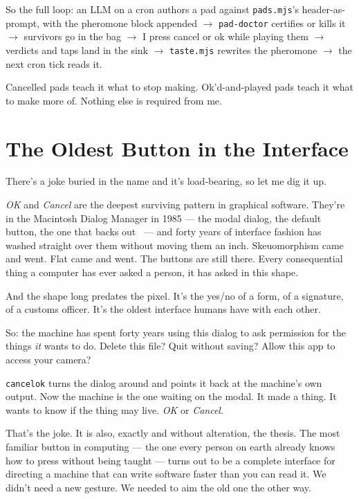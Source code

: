 \documentclass[10pt,letterpaper,twocolumn]{article}
\begin{document}
So the full loop: an LLM on a cron authors a pad against \texttt{pads.mjs}'s header-as-prompt, with the pheromone block appended $\rightarrow$ \texttt{pad-doctor} certifies or kills it $\rightarrow$ survivors go in the bag $\rightarrow$ I press cancel or ok while playing them $\rightarrow$ verdicts and taps land in the sink $\rightarrow$ \texttt{taste.mjs} rewrites the pheromone $\rightarrow$ the next cron tick reads it.

Cancelled pads teach it what to stop making. Ok'd-and-played pads teach it what to make more of. Nothing else is required from me.


\section{The Oldest Button in the Interface}

There's a joke buried in the name and it's load-bearing, so let me dig it up.

\emph{OK} and \emph{Cancel} are the deepest surviving pattern in graphical software. They're in the Macintosh Dialog Manager in 1985 --- the modal dialog, the default button, the one that backs out~\citep{insidemac1985} --- and forty years of interface fashion has washed straight over them without moving them an inch. Skeuomorphism came and went. Flat came and went. The buttons are still there. Every consequential thing a computer has ever asked a person, it has asked in this shape.

And the shape long predates the pixel. It's the yes/no of a form, of a signature, of a customs officer. It's the oldest interface humans have with each other.

So: the machine has spent forty years using this dialog to ask permission for the things \emph{it} wants to do. Delete this file? Quit without saving? Allow this app to access your camera?

\texttt{cancelok} turns the dialog around and points it back at the machine's own output. Now the machine is the one waiting on the modal. It made a thing. It wants to know if the thing may live. \emph{OK} or \emph{Cancel}.

That's the joke. It is also, exactly and without alteration, the thesis. The most familiar button in computing --- the one every person on earth already knows how to press without being taught --- turns out to be a complete interface for directing a machine that can write software faster than you can read it. We didn't need a new gesture. We needed to aim the old one the other way.
\end{document}
